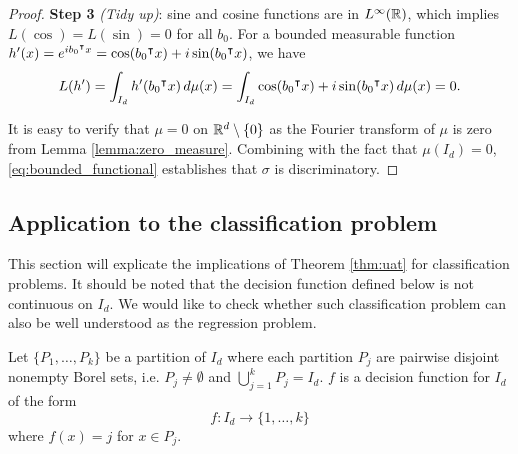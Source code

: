 \begin{proof}
    \textbf{Step 3} \textit{(Tidy up)}: sine and cosine functions are in
    $L^{\infty}(\mathbb{R})$, which implies $L(\cos) = L(\sin) = 0$ for all $b_0$. For a
    bounded measurable function $h'(x) = e^{ib_0{}^{\intercal} x} = \cos(b_0{}^{\intercal} x) + i
    \sin(b_0{}^{\intercal} x)$, we have
    \begin{equation}
        \label{eq:bounded_functional}
        L(h') = \int_{I_d} h'(b_0{}^{\intercal} x) \,d\mu(x) 
              = \int_{I_d} \cos(b_0{}^{\intercal} x) + i \sin(b_0{}^{\intercal} x) \,d\mu(x)
              = 0.
    \end{equation}

    It is easy to verify that $\mu = 0$ on $\mathbb{R}^d \setminus \{0\}$ as the Fourier
    transform of $\mu$ is zero from Lemma \ref{lemma:zero_measure}. Combining
    with the fact that $\mu(I_d) = 0$, \eqref{eq:bounded_functional} establishes
    that $\sigma$ is discriminatory.

\end{proof}





\subsection{Application to the classification problem}

This section will explicate the implications of Theorem \ref{thm:uat} for
classification problems. It should be noted that the decision function defined
below is not continuous on $I_d$. We would like to check whether such
classification problem can also be well understood as the regression problem.

\begin{definition}
    Let $\{P_1, \dots, P_k\}$ be a partition of $I_d$ where each partition $P_j$
    are pairwise disjoint nonempty Borel sets, i.e. $P_j \not= \emptyset$ and
    $\bigcup_{j=1}^k P_j = I_d$. $f$ is a decision function for $I_d$ of the
    form
    \begin{equation}
        f: I_d \to \{1, \dots, k\}
    \end{equation}
    where $f(x) = j$ for $x \in P_j$. 
\end{definition}

